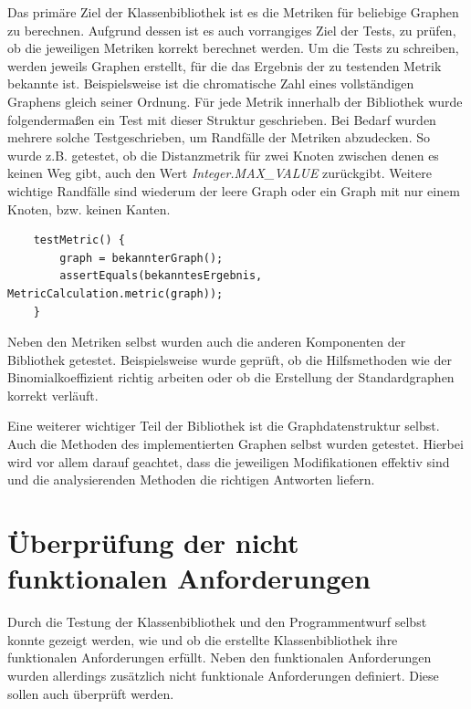 \documentclass[a4paper,12pt,ngerman,chapterprefix=false,listof=totoc,bibliography=totoc]{scrreprt}
\begin{document}
{{{Das primäre Ziel der Klassenbibliothek ist es die Metriken für beliebige Graphen zu berechnen. Aufgrund dessen ist es auch vorrangiges Ziel der Tests, zu prüfen, ob die jeweiligen Metriken korrekt berechnet werden. Um die Tests zu schreiben, werden jeweils Graphen erstellt, für die das Ergebnis der zu testenden Metrik bekannte ist. Beispielsweise ist die chromatische Zahl eines vollständigen Graphens gleich seiner Ordnung. Für jede Metrik innerhalb der Bibliothek wurde folgendermaßen ein Test mit dieser Struktur geschrieben. Bei Bedarf wurden mehrere solche Testgeschrieben, um Randfälle der Metriken abzudecken. So wurde z.B. getestet, ob die Distanzmetrik für zwei Knoten zwischen denen es keinen Weg gibt, auch den Wert \textit{Integer.MAX\_VALUE} zurückgibt. Weitere wichtige Randfälle sind wiederum der leere Graph oder ein Graph mit nur einem Knoten, bzw. keinen Kanten.
\begin{lstlisting}
	testMetric() {
		graph = bekannterGraph();
		assertEquals(bekanntesErgebnis, MetricCalculation.metric(graph));
	}
\end{lstlisting}
Neben den Metriken selbst wurden auch die anderen Komponenten der Bibliothek getestet. Beispielsweise wurde geprüft, ob die Hilfsmethoden wie der Binomialkoeffizient richtig arbeiten oder ob die Erstellung der Standardgraphen korrekt verläuft.

Eine weiterer wichtiger Teil der Bibliothek ist die Graphdatenstruktur selbst. Auch die Methoden des implementierten Graphen selbst wurden getestet. Hierbei wird vor allem darauf geachtet, dass die jeweiligen Modifikationen effektiv sind und die analysierenden Methoden die richtigen Antworten liefern.
}
\section{Überprüfung der nicht funktionalen Anforderungen}
{
Durch die Testung der Klassenbibliothek und den Programmentwurf selbst konnte gezeigt werden, wie und ob die erstellte Klassenbibliothek ihre funktionalen Anforderungen erfüllt. Neben den funktionalen Anforderungen wurden allerdings zusätzlich nicht funktionale Anforderungen definiert. Diese sollen auch überprüft werden.

}}}
\end{document}

